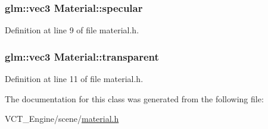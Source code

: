 \subsubsection[{specular}]{\setlength{\rightskip}{0pt plus 5cm}glm\+::vec3 Material\+::specular}\label{class_material_aac1c499923ff99564cdd97a4b5e504a9}


Definition at line 9 of file material.\+h.

\hypertarget{class_material_ad65e6df916690d7a2e59d18ec3f25c1c}{}
\subsubsection[{transparent}]{\setlength{\rightskip}{0pt plus 5cm}glm\+::vec3 Material\+::transparent}\label{class_material_ad65e6df916690d7a2e59d18ec3f25c1c}


Definition at line 11 of file material.\+h.



The documentation for this class was generated from the following file\+:\begin{DoxyCompactItemize}
\item 
V\+C\+T\+\_\+\+Engine/scene/\hyperlink{material_8h}{material.\+h}\end{DoxyCompactItemize}
